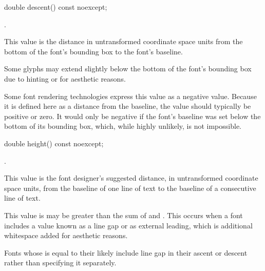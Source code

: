 \begin{itemdecl}
    double descent() const noexcept;
\end{itemdecl}
\begin{itemdescr}
	\pnum
	\returns
	.
	
	\pnum
	\remarks
	This value is the distance in untransformed coordinate space units from the bottom of the font's bounding box to the font's baseline.
	
	\pnum
	Some glyphs may extend slightly below the bottom of the font's bounding box due to hinting or for aesthetic reasons.
	
	\pnum
	\enternote
	Some font rendering technologies express this value as a negative value. Because it is defined here as a distance from the baseline, the value should typically be positive or zero. It would only be negative if the font's baseline was set below the bottom of its bounding box, which, while highly unlikely, is not impossible.
	\exitnote

\end{itemdescr}

\begin{itemdecl}
    double height() const noexcept;
\end{itemdecl}
\begin{itemdescr}
	\pnum
	\returns
	.
	
	\pnum
	\remarks
	This value is the font designer's suggested distance, in untransformed coordinate space units, from the baseline of one line of text to the baseline of a consecutive line of text.
	
	\pnum
	This value is may be greater than the sum of  and . This occurs when a font includes a value known as a line gap or as external leading, which is additional whitespace added for aesthetic reasons.
	
	\pnum	
	Fonts whose  is equal to their  likely include line gap in their ascent or descent rather than specifying it separately.

\end{itemdescr}
